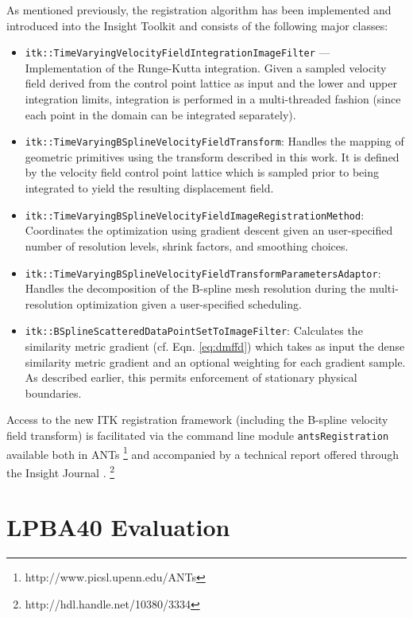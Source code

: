 \documentclass{llncs}
\begin{document}
As mentioned previously, the registration algorithm has been implemented 
and introduced into the
Insight Toolkit and consists of the following major classes: 
\begin{itemize}
  \item \verb#itk::TimeVaryingVelocityFieldIntegrationImageFilter# ---
Implementation of 
the Runge-Kutta integration.  Given a 
sampled velocity field derived from the control point lattice as 
input and the lower and upper integration limits, integration is performed 
in a multi-threaded fashion (since each point in the domain
can be integrated separately).  
  \item \verb#itk::TimeVaryingBSplineVelocityFieldTransform#:
Handles the mapping of geometric primitives
using the transform described in this work.  It is defined by the velocity field
control point lattice which is sampled prior to being integrated to yield the 
resulting displacement field.  
  \item \verb#itk::TimeVaryingBSplineVelocityFieldImageRegistrationMethod#: 
  Coordinates the optimization
  using gradient descent given an user-specified number of resolution levels, shrink
  factors, and smoothing choices.  
  \item \verb#itk::TimeVaryingBSplineVelocityFieldTransformParametersAdaptor#:
  Handles the decomposition of the B-spline mesh resolution during the multi-resolution optimization
  given a user-specified scheduling. 
  \item \verb#itk::BSplineScatteredDataPointSetToImageFilter#:
  Calculates the similarity metric gradient (cf. Eqn. \ref{eq:dmffd}) which takes as input the 
  dense similarity metric gradient and an optional weighting for each gradient sample.  As 
  described earlier, this permits enforcement of stationary physical boundaries. %
\end{itemize}

Access to the new ITK 
registration framework (including the B-spline velocity field transform) 
is facilitated
via the command line module \verb#antsRegistration# available both in ANTs%
\footnote{
http://www.picsl.upenn.edu/ANTs
}
and accompanied by a technical report offered through the Insight Journal
\cite{tustison2012}.%
\footnote{
http://hdl.handle.net/10380/3334
}

\section{LPBA40 Evaluation}
\end{document}
